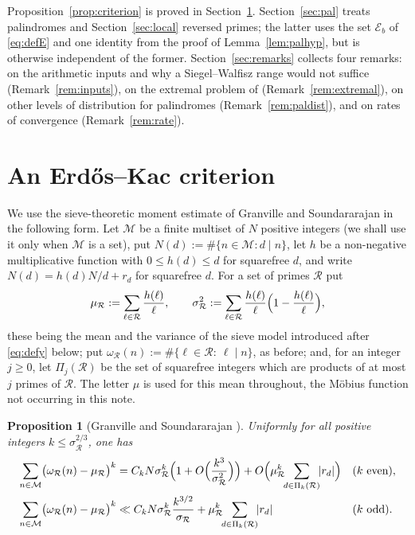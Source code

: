 \documentclass[11pt,a4paper]{article}
\theoremstyle{plain}
\newtheorem{proposition}[theorem]{Proposition}
\theoremstyle{definition}
\numberwithin{equation}{section}
\begin{document}
Proposition~\ref{prop:criterion} is proved in Section~\ref{sec:criterion}. Section~\ref{sec:pal} treats
palindromes and Section~\ref{sec:local} reversed primes; the latter uses the set $\mathcal E_b$ of
\eqref{eq:defE} and one identity from the proof of Lemma~\ref{lem:palhyp}, but is otherwise independent
of the former. Section~\ref{sec:remarks} collects four remarks: on the arithmetic inputs and why a
Siegel--Walfisz range would not suffice (Remark~\ref{rem:inputs}), on the extremal problem of
\cite{BSh} (Remark~\ref{rem:extremal}), on other levels of distribution for palindromes
(Remark~\ref{rem:paldist}), and on rates of convergence (Remark~\ref{rem:rate}).


\section{An Erd\H os--Kac criterion}\label{sec:criterion}

We use the sieve-theoretic moment estimate of Granville and Soundararajan in the following form. Let
$\mathcal M$ be a finite multiset of $N$ positive integers (we shall use it only when $\mathcal M$ is a
set), put $N(d):=\#\{n\in\mathcal M:d\mid n\}$, let $h$ be a non-negative multiplicative function with
$0\le h(d)\le d$ for squarefree $d$, and write $N(d)=h(d)N/d+r_d$ for squarefree $d$. For a set of
primes $\mathcal R$ put
\[
\mu_{\mathcal R}:=\sum_{\ell\in\mathcal R}\frac{h(\ell)}{\ell},\qquad
\sigma_{\mathcal R}^{2}:=\sum_{\ell\in\mathcal R}\frac{h(\ell)}{\ell}\Bigl(1-\frac{h(\ell)}{\ell}\Bigr),
\]
these being the mean and the variance of the sieve model introduced after \eqref{eq:defy} below; put
$\omega_{\mathcal R}(n):=\#\{\ell\in\mathcal R:\ \ell\mid n\}$, as before; and, for an integer
$j\ge0$, let $\Pi_j(\mathcal R)$ be the set of squarefree integers which are products of at most $j$
primes of $\mathcal R$. The letter $\mu$ is used for this mean throughout, the M\"obius function not
occurring in this note.

\begin{proposition}[Granville and Soundararajan {\cite[Prop.~3]{GS}}]\label{prop:gs}
Uniformly for all positive integers $k\le\sigma_{\mathcal R}^{2/3}$, one has
\[
\begin{aligned}
\sum_{n\in\mathcal M}\bigl(\omega_{\mathcal R}(n)-\mu_{\mathcal R}\bigr)^{k}
  &= C_kN\sigma_{\mathcal R}^{k}\Bigl(1+O\Bigl(\frac{k^{3}}{\sigma_{\mathcal R}^{2}}\Bigr)\Bigr)
     +O\Bigl(\mu_{\mathcal R}^{k}\!\!\sum_{d\in \Pi_k(\mathcal R)}\!\!|r_d|\Bigr)
  && (k\ \text{even}),\\
\sum_{n\in\mathcal M}\bigl(\omega_{\mathcal R}(n)-\mu_{\mathcal R}\bigr)^{k}
  &\ll C_kN\sigma_{\mathcal R}^{k}\frac{k^{3/2}}{\sigma_{\mathcal R}}
     +\mu_{\mathcal R}^{k}\!\!\sum_{d\in \Pi_k(\mathcal R)}\!\!|r_d|
  && (k\ \text{odd}).
\end{aligned}
\]
\end{proposition}
\end{document}
